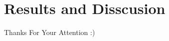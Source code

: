 \documentclass{beamer}
\begin{document}
\section{Results and Disscusion}


\begin{frame}
\Huge{\centerline{Thanks For Your Attention :)}}
\end{frame}

\end{document}

